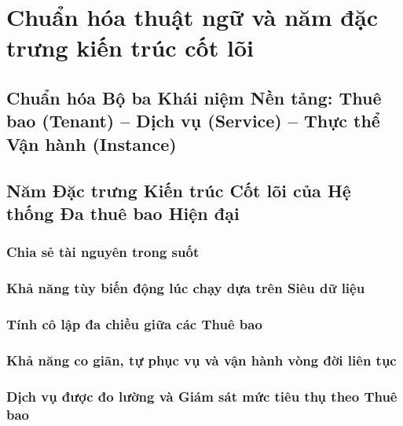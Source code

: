 \par{}
\section{Chuẩn hóa thuật ngữ và năm đặc trưng kiến trúc cốt lõi}
\label{outline:1:concepts:1}

\par{}
\subsection{Chuẩn hóa Bộ ba Khái niệm Nền tảng: Thuê bao (Tenant) – Dịch vụ (Service) – Thực thể Vận hành (Instance)}
\label{outline:1:concepts:2}

\par{}
\subsection{Năm Đặc trưng Kiến trúc Cốt lõi của Hệ thống Đa thuê bao Hiện đại}
\label{outline:1:concepts:3}

\par{}
\subsubsection{Chia sẻ tài nguyên trong suốt}
\label{outline:1:concepts:4}

\par{}
\subsubsection{Khả năng tùy biến động lúc chạy dựa trên Siêu dữ liệu}
\label{outline:1:concepts:5}

\par{}
\subsubsection{Tính cô lập đa chiều giữa các Thuê bao}
\label{outline:1:concepts:6}

\par{}
\subsubsection{Khả năng co giãn, tự phục vụ và vận hành vòng đời liên tục}
\label{outline:1:concepts:7}

\par{}
\subsubsection{Dịch vụ được đo lường và Giám sát mức tiêu thụ theo Thuê bao}
\label{outline:1:concepts:8}
